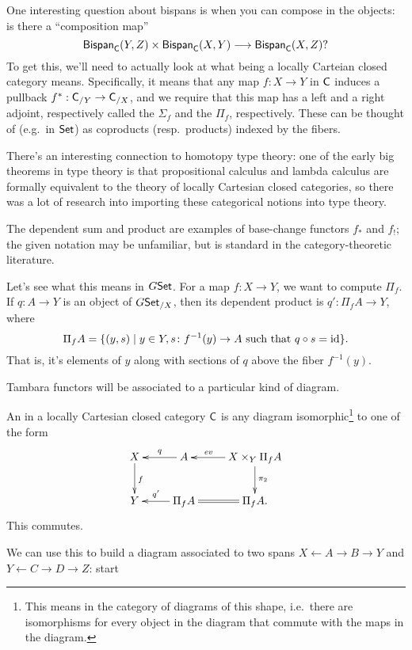 One interesting question about bispans is when you can compose in the objects: is there a ``composition map''
\begin{equation}
\label{compbispan}
\mathsf{Bispan}_\mathsf C(Y,Z)\times\mathsf{Bispan}_\mathsf C(X,Y)\longrightarrow\mathsf{Bispan}_\mathsf C(X,Z)?
\end{equation}
To get this, we'll need to actually look at what being a locally Carteian closed category means. Specifically, it
means that any map $f\colon X\to Y$ in $\mathsf C$ induces a pullback $f^*:\mathsf C_{/Y}\to\mathsf C_{/X}$, and we require that this
map has a left and a right adjoint, respectively called the  $\Sigma_f$ and the  $\Pi_f$, respectively. These can be thought of (e.g.\ in $\mathsf{Set}$) as coproducts (resp.\ products) indexed
by the fibers.
\begin{rem}
There's an interesting connection to homotopy type theory: one of the early big theorems in type theory is that
propositional calculus and lambda calculus are formally equivalent to the theory of locally Cartesian closed
categories, so there was a lot of research into importing these categorical notions into type theory.

The dependent sum and product are examples of base-change functors $f_*$ and $f_!$; the given notation may be
unfamiliar, but is standard in the category-theoretic literature.
\end{rem}
\begin{exm}
Let's see what this means in $G\mathsf{Set}$. For a map $f\colon X\to Y$, we want to compute $\Pi_f$. If $q\colon A\to Y$
is an object of $G\mathsf{Set}_{/X}$, then its dependent product is $q'\colon \Pi_fA\to Y$, where
\[\Pi_f A = \{(y,s)\mid y\in Y, s\colon f^{-1}(y)\to A\text{ such that } q\circ s = \mathrm{id}\}.\]
That is, it's elements of $y$ along with sections of $q$ above the fiber $f^{-1}(y)$.
\end{exm}
Tambara functors will be associated to a particular kind of diagram.
\begin{defn}
An  in a locally Cartesian closed category $\mathsf C$ is any diagram isomorphic\footnote{This
means in the category of diagrams of this shape, i.e.\ there are isomorphisms for every object in the diagram that
commute with the maps in the diagram.} to one of the form
\[\xymatrix{
	X\ar[d]^f & A\ar[l]_-q & X\times_Y \Pi_f A\ar[l]_-{\mathit{ev}}\ar[d]^{\pi_2}\\
	Y & \Pi_f A\ar[l]_-{q'} & \Pi_fA.\ar@{=}[l]
}\]
This commutes.
\end{defn}
We can use this to build a diagram associated to two spans $X\gets A\to B\to Y$ and $Y\gets C\to D\to Z$: start
